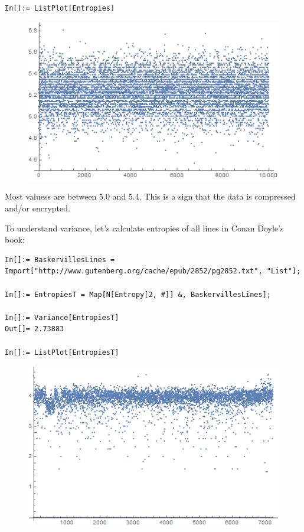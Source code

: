 \begin{lstlisting}
In[]:= ListPlot[Entropies]
\end{lstlisting}

\begin{figure}[H]
\centering
\includegraphics[scale=\FigScale]{examples/encrypted_DB1/entropy.png}
\end{figure}

Most valuess are between 5.0 and 5.4.
This is a sign that the data is compressed and/or encrypted.

To understand variance, let's calculate entropies of all lines in Conan Doyle's  book:

\begin{lstlisting}
In[]:= BaskervillesLines = Import["http://www.gutenberg.org/cache/epub/2852/pg2852.txt", "List"];

In[]:= EntropiesT = Map[N[Entropy[2, #]] &, BaskervillesLines];

In[]:= Variance[EntropiesT]
Out[]= 2.73883

In[]:= ListPlot[EntropiesT]
\end{lstlisting}

\begin{figure}[H]
\centering
\includegraphics[scale=\FigScale]{examples/encrypted_DB1/conan_doyle.png}
\end{figure}

